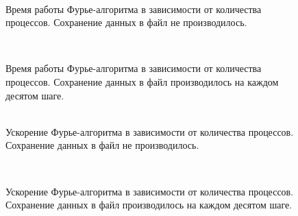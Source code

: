     \begin{figure}[h!]
        \begin{center}
            \begin{minipage}{\minipagewidth}
                 \\
                \caption{Время работы Фурье-алгоритма в зависимости от количества процессов. Сохранение данных в файл не производилось.}
                \label{fig:AppVsTimeFourierNosave}
            \end{minipage}
            \hfill
            \begin{minipage}{\minipagewidth}
                 \\
                \caption{Время работы Фурье-алгоритма в зависимости от количества процессов. Сохранение данных в файл производилось на каждом десятом шаге.}
                \label{fig:AppVsTimeFourierSave}
            \end{minipage}
        \end{center}
    \end{figure}

    \begin{figure}[h!]
        \begin{center}
            \begin{minipage}{\minipagewidth}
                 \\
                \caption{Ускорение Фурье-алгоритма в зависимости от количества процессов. Сохранение данных в файл не производилось.}
                \label{fig:AppVsSpeedupFourierNosave}
            \end{minipage}
            \hfill
            \begin{minipage}{\minipagewidth}
                 \\
                \caption{Ускорение Фурье-алгоритма в зависимости от количества процессов. Сохранение данных в файл производилось на каждом десятом шаге.}
                \label{fig:AppVsSpeedupFourierSave}
            \end{minipage}
        \end{center}
    \end{figure}

